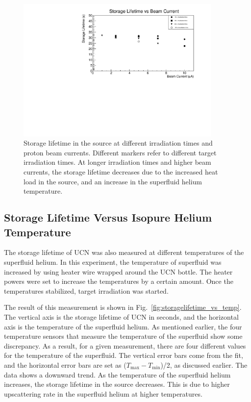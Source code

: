 \begin{figure}[h!]
  \centering
  \includegraphics[width=0.9\textwidth]{StorageLifetime_17009_and_17009A.pdf}
  \caption[UCN storage lifetime at different irradiation times and
  proton beam currents]{Storage lifetime in the source at different
    irradiation times and proton beam currents. Different markers
    refer to different target irradiation times. At longer irradiation
    times and higher beam currents, the storage lifetime decreases due
    to the increased heat load in the source, and an increase in the
    superfluid helium temperature.}
  \label{fig:storage_beam_irrad}
\end{figure}


\subsection{Storage Lifetime Versus Isopure Helium Temperature}
The storage lifetime of UCN was also measured at different
temperatures of the superfluid helium. In this experiment, the
temperature of superfluid was increased by using heater wire wrapped
around the UCN bottle. The heater powers were set to increase the
temperatures by a certain amount. Once the temperatures stabilized,
target irradiation was started.

The result of this measurement is shown in
Fig.~\ref{fig:storagelifetime_vs_temp}. The vertical axis is the
storage lifetime of UCN in seconds, and the horizontal axis is the
temperature of the superfluid helium. As mentioned earlier, the four
temperature sensors that measure the temperature of the superfluid
show some discrepancy. As a result, for a given measurement, there are
four different values for the temperature of the superfluid. The
vertical error bars come from the fit, and the horizontal error bars
are set as ($T_{\mathrm{max}} - T_{\mathrm{min}}$)/2, as discussed
earlier. The data shows a downward trend. As the temperature of the
superfluid helium increases, the storage lifetime in the source
decreases. This is due to higher upscattering rate in the superfluid
helium at higher temperatures.


